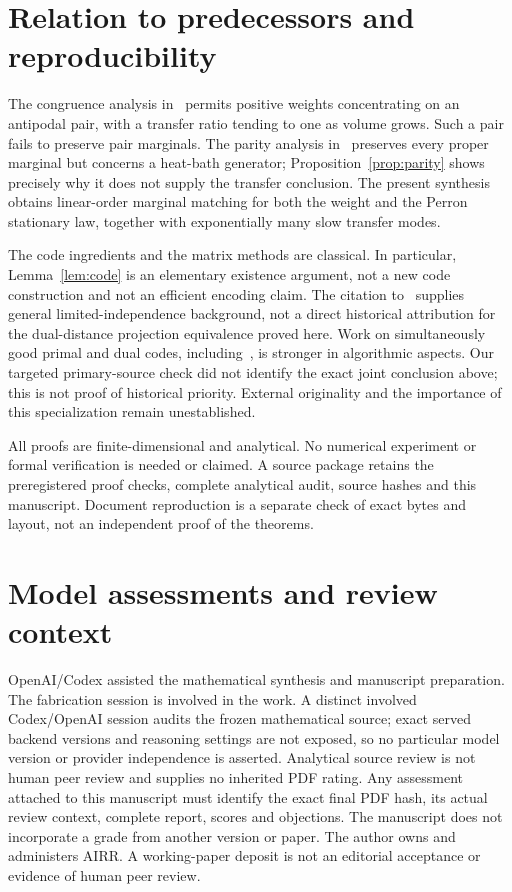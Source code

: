 \documentclass[11pt]{article}
\begin{document}
\section{Relation to predecessors and reproducibility}
The congruence analysis in~\cite{ErikssonCongruence} permits positive
weights concentrating on an antipodal pair, with a transfer ratio tending
to one as volume grows. Such a pair fails to preserve pair marginals.
The parity analysis in~\cite{ErikssonParity} preserves every proper
marginal but concerns a heat-bath generator; Proposition~\ref{prop:parity}
shows precisely why it does not supply the transfer conclusion.
The present synthesis obtains linear-order marginal matching for both
the weight and the Perron stationary law, together with exponentially
many slow transfer modes.

The code ingredients and the matrix methods are classical. In particular,
Lemma~\ref{lem:code} is an elementary existence argument, not a new code
construction and not an efficient encoding claim. The citation to~\cite{AGM} supplies general limited-independence background, not a direct historical attribution for the dual-distance projection equivalence proved here. Work on simultaneously
good primal and dual codes, including~\cite{BrehmResch}, is stronger in
algorithmic aspects. Our targeted primary-source check did not identify
the exact joint conclusion above; this is not proof of historical priority.
External originality and the importance of this specialization remain
unestablished.

All proofs are finite-dimensional and analytical. No numerical experiment
or formal verification is needed or claimed. A source package retains the
preregistered proof checks, complete analytical audit, source hashes and
this manuscript. Document reproduction is a separate check of exact bytes
and layout, not an independent proof of the theorems.

\section*{Model assessments and review context}
OpenAI/Codex assisted the mathematical synthesis and manuscript preparation.
The fabrication session is involved in the work. A distinct involved
Codex/OpenAI session audits the frozen mathematical source; exact served
backend versions and reasoning settings are not exposed, so no particular
model version or provider independence is asserted. Analytical source
review is not human peer review and supplies no inherited PDF rating.
Any assessment attached to this manuscript must identify the exact final
PDF hash, its actual review context, complete report, scores and objections.
The manuscript does not incorporate a grade from another version or paper.
The author owns and administers AIRR. A working-paper deposit is not an
editorial acceptance or evidence of human peer review.
\end{document}
